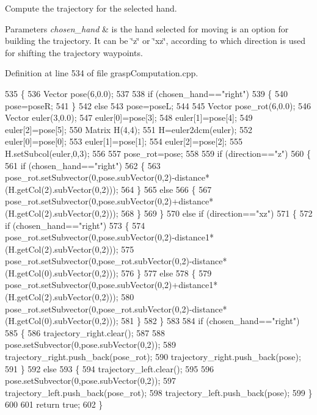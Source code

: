 Compute the trajectory for the selected hand. 


\begin{DoxyParams}{Parameters}
{\em chosen\+\_\+hand} & is the hand selected for moving  is an option for building the trajectory. It can be \char`\"{}z\char`\"{} or \char`\"{}xz\char`\"{}, according to which direction is used for shifting the trajectory waypoints. \\
\hline
\end{DoxyParams}


Definition at line 534 of file grasp\+Computation.\+cpp.


\begin{DoxyCode}
535 \{
536     Vector pose(6,0.0);
537 
538     \textcolor{keywordflow}{if} (chosen\_hand==\textcolor{stringliteral}{"right"})
539     \{
540         pose=poseR;
541     \}
542     \textcolor{keywordflow}{else}
543         pose=poseL;
544 
545     Vector pose\_rot(6,0.0);
546     Vector euler(3,0.0);
547     euler[0]=pose[3];
548     euler[1]=pose[4];
549     euler[2]=pose[5];
550     Matrix H(4,4);
551     H=euler2dcm(euler);
552     euler[0]=pose[0];
553     euler[1]=pose[1];
554     euler[2]=pose[2];
555     H.setSubcol(euler,0,3);
556 
557     pose\_rot=pose;
558 
559     \textcolor{keywordflow}{if} (direction==\textcolor{stringliteral}{"z"})
560     \{
561         \textcolor{keywordflow}{if} (chosen\_hand==\textcolor{stringliteral}{"right"})
562         \{
563             pose\_rot.setSubvector(0,pose.subVector(0,2)-distance*(H.getCol(2).subVector(0,2)));
564         \}
565         \textcolor{keywordflow}{else}
566         \{
567             pose\_rot.setSubvector(0,pose.subVector(0,2)+distance*(H.getCol(2).subVector(0,2)));
568         \}
569     \}
570     \textcolor{keywordflow}{else} \textcolor{keywordflow}{if} (direction==\textcolor{stringliteral}{"xz"})
571     \{
572         \textcolor{keywordflow}{if} (chosen\_hand==\textcolor{stringliteral}{"right"})
573         \{
574             pose\_rot.setSubvector(0,pose.subVector(0,2)-distance1*(H.getCol(2).subVector(0,2)));
575             pose\_rot.setSubvector(0,pose\_rot.subVector(0,2)-distance*(H.getCol(0).subVector(0,2)));
576         \}
577         \textcolor{keywordflow}{else}
578         \{
579             pose\_rot.setSubvector(0,pose.subVector(0,2)+distance1*(H.getCol(2).subVector(0,2)));
580             pose\_rot.setSubvector(0,pose\_rot.subVector(0,2)-distance*(H.getCol(0).subVector(0,2)));
581         \}
582     \}
583 
584     \textcolor{keywordflow}{if} (chosen\_hand==\textcolor{stringliteral}{"right"})
585     \{
586         trajectory_right.clear();
587 
588         pose.setSubvector(0,pose.subVector(0,2));
589         trajectory_right.push\_back(pose\_rot);
590         trajectory_right.push\_back(pose);
591     \}
592     \textcolor{keywordflow}{else}
593     \{
594         trajectory_left.clear();
595 
596         pose.setSubvector(0,pose.subVector(0,2));
597         trajectory_left.push\_back(pose\_rot);
598         trajectory_left.push\_back(pose);
599     \}
600 
601     \textcolor{keywordflow}{return} \textcolor{keyword}{true};
602 \}
\end{DoxyCode}
